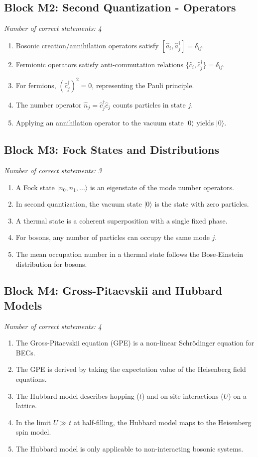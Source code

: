 \documentclass[a4paper,12pt]{article}
\begin{document}
\subsection*{Block M2: Second Quantization - Operators}
\textit{Number of correct statements: 4}
\begin{enumerate}[label=\roman*.]
    \item Bosonic creation/annihilation operators satisfy $[\hat{a}_i, \hat{a}_j^\dagger] = \delta_{ij}$.
    \item Fermionic operators satisfy anti-commutation relations $\{\hat{c}_i, \hat{c}_j^\dagger\} = \delta_{ij}$.
    \item For fermions, $(\hat{c}_j^\dagger)^2 = 0$, representing the Pauli principle.
    \item The number operator $\hat{n}_j = \hat{c}_j^\dagger \hat{c}_j$ counts particles in state $j$.
    \item Applying an annihilation operator to the vacuum state $|0\rangle$ yields $|0\rangle$.
\end{enumerate}

\subsection*{Block M3: Fock States and Distributions}
\textit{Number of correct statements: 3}
\begin{enumerate}[label=\roman*.]
    \item A Fock state $|n_0, n_1, ...\rangle$ is an eigenstate of the mode number operators.
    \item In second quantization, the vacuum state $|0\rangle$ is the state with zero particles.
    \item A thermal state is a coherent superposition with a single fixed phase.
    \item For bosons, any number of particles can occupy the same mode $j$.
    \item The mean occupation number in a thermal state follows the Bose-Einstein distribution for bosons.
\end{enumerate}

\subsection*{Block M4: Gross-Pitaevskii and Hubbard Models}
\textit{Number of correct statements: 4}
\begin{enumerate}[label=\roman*.]
    \item The Gross-Pitaevskii equation (GPE) is a non-linear Schrödinger equation for BECs.
    \item The GPE is derived by taking the expectation value of the Heisenberg field equations.
    \item The Hubbard model describes hopping ($t$) and on-site interactions ($U$) on a lattice.
    \item In the limit $U \gg t$ at half-filling, the Hubbard model maps to the Heisenberg spin model.
    \item The Hubbard model is only applicable to non-interacting bosonic systems.
\end{enumerate}
\end{document}
